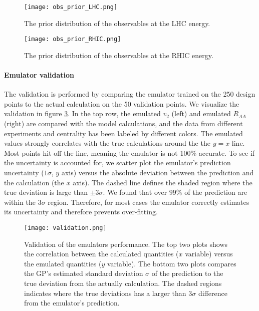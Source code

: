 \begin{figure}
\centering
\texttt{[image: obs\_prior\_LHC.png]}
\caption{The prior distribution of the observables at the LHC energy.}
\label{fig:new:obs_prior_LHC}
\end{figure}

\begin{figure}
\centering
\texttt{[image: obs\_prior\_RHIC.png]}
\caption{The prior distribution of the observables at the RHIC energy.}
\label{fig:new:obs_prior_RHIC}
\end{figure}

\paragraph{Emulator validation} 
The validation is performed by comparing the emulator trained on the 250 design points to the actual calculation on the 50 validation points.
We visualize the validation in figure \ref{fig:new:validation}.
In the top row, the emulated $v_2$ (left) and emulated $R_{AA}$ (right) are compared with the model calculations, and the data from different experiments and centrality has been labeled by different colors.
The emulated values strongly correlates with the true calculations around the the $y=x$ line.
Most points hit off the line, meaning the emulator is not 100\% accurate.
To see if the uncertainty is accounted for, we scatter plot the emulator's prediction uncertainty ($1\sigma$, $y$ axis) versus the absolute deviation between the prediction and the calculation (the $x$ axis).
The dashed line defines the shaded region where the true deviation is large than $\pm 3\sigma$.
We found that over $99\%$ of the prediction are within the $3\sigma$ region.
Therefore, for most cases the emulator correctly estimates its uncertainty  and therefore prevents over-fitting.

\begin{figure}
\centering
\texttt{[image: validation.png]}
\caption{Validation of the emulators performance. The top two plots shows the correlation between the calculated quantities ($x$ variable) versus the emulated quantities ($y$ variable). The bottom two plots compares the GP's estimated standard deviation $\sigma$ of the prediction to the true deviation from the actually calculation. The dashed regions indicates where the true deviations has a larger than $3\sigma$ difference from the emulator's prediction.}
\label{fig:new:validation}
\end{figure}

